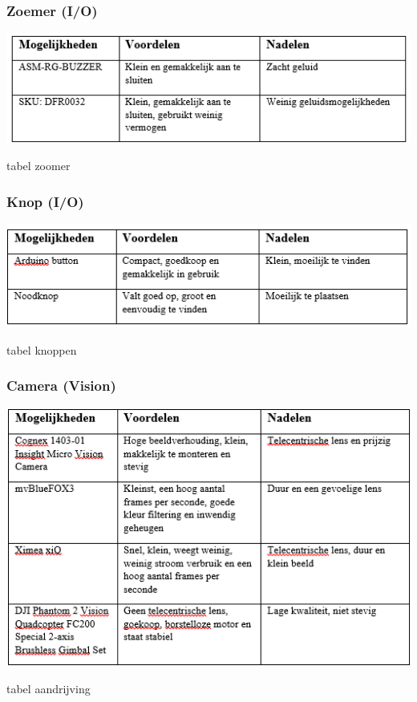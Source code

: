 \documentclass[12pt]{article} %
\begin{document}
\subsubsection{Zoemer (I/O)}
\begin{center}
\begin{table}[h]
\includegraphics[scale=1.]{tabelZoomer.png}
\caption{tabel zoomer}
\label{fig:deployment}
\end{table}
\end{center}
\clearpage

\subsubsection{Knop (I/O)}
\begin{center}
\begin{table}[h]
\includegraphics[scale=1.]{tabelKnop.png}
\caption{tabel knoppen}
\label{fig:deployment}
\end{table}
\end{center}

\subsubsection{Camera (Vision)}
\begin{center}
\begin{table}[h]
\includegraphics[scale=1.]{tabelCam.png}
\caption{tabel aandrijving}
\label{fig:deployment}
\end{table}
\end{center}
\clearpage
\end{document}
